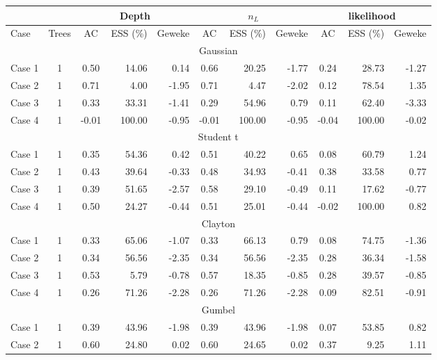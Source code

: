 \documentclass{amsart}
\begin{document}
\begin{table}[ht]
	\centering
	\scriptsize{
		\begin{tabular}{lc|crr|crr|crr}
			\toprule
			\multicolumn{2}{c|}{} &
			\multicolumn{3}{c|}{Depth} &
			\multicolumn{3}{c|}{$n_L$} &
			\multicolumn{3}{c}{likelihood} \\
			\midrule
			Case & Trees & AC & ESS (\%) & Geweke & AC & ESS (\%) & Geweke & AC & ESS (\%) & Geweke \\ 
			\midrule
			\multicolumn{11}{c}{Gaussian} \\
			\midrule
			Case 1 & 1 & 0.50 & 14.06 & 0.14 & 0.66 & 20.25 & -1.77 & 0.24 & 28.73 & -1.27 \\ 
			Case 2 & 1 & 0.71 & 4.00 & -1.95 & 0.71 & 4.47 & -2.02 & 0.12 & 78.54 & 1.35 \\ 
			Case 3 & 1 & 0.33 & 33.31 & -1.41 & 0.29 & 54.96 & 0.79 & 0.11 & 62.40 & -3.33 \\ 
			Case 4 & 1 & -0.01 & 100.00 & -0.95 & -0.01 & 100.00 & -0.95 & -0.04 & 100.00 & -0.02 \\ 
			\midrule
			\multicolumn{11}{c}{Student t} \\
			\midrule
			Case 1 & 1 & 0.35 & 54.36 & 0.42 & 0.51 & 40.22 & 0.65 & 0.08 & 60.79 & 1.24 \\ 
			Case 2 & 1 & 0.43 & 39.64 & -0.33 & 0.48 & 34.93 & -0.41 & 0.38 & 33.58 & 0.77 \\ 
			Case 3 & 1 & 0.39 & 51.65 & -2.57 & 0.58 & 29.10 & -0.49 & 0.11 & 17.62 & -0.77 \\ 
			Case 4 & 1 & 0.50 & 24.27 & -0.44 & 0.51 & 25.01 & -0.44 & -0.02 & 100.00 & 0.82 \\ 
			\midrule
			\multicolumn{11}{c}{Clayton} \\
			\midrule
			Case 1 & 1 & 0.33 & 65.06 & -1.07 & 0.33 & 66.13 & 0.79 & 0.08 & 74.75 & -1.36 \\ 
			Case 2 & 1 & 0.34 & 56.56 & -2.35 & 0.34 & 56.56 & -2.35 & 0.28 & 36.34 & -1.58 \\ 
			Case 3 & 1 & 0.53 & 5.79 & -0.78 & 0.57 & 18.35 & -0.85 & 0.28 & 39.57 & -0.85 \\ 
			Case 4 & 1 & 0.26 & 71.26 & -2.28 & 0.26 & 71.26 & -2.28 & 0.09 & 82.51 & -0.91 \\ 
			\midrule
			\multicolumn{11}{c}{Gumbel} \\
			\midrule
			Case 1 & 1 & 0.39 & 43.96 & -1.98 & 0.39 & 43.96 & -1.98 & 0.07 & 53.85 & 0.82 \\ 
			Case 2 & 1 & 0.60 & 24.80 & 0.02 & 0.60 & 24.65 & 0.02 & 0.37 & 9.25 & 1.11 \\ 

\end{tabular}}
\end{table}
\end{document}
